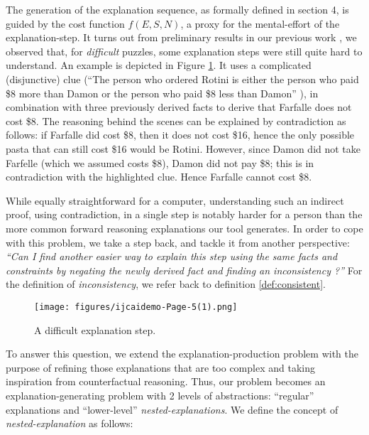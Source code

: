 The generation of the explanation sequence, as formally defined in section 4, is guided by the cost function $f(E, S, N)$, a proxy for the mental-effort of the explanation-step. 
It turns out from preliminary results in our previous work \cite{ecai/BogaertsGCG20}, we observed that, for \textit{difficult} puzzles, some explanation steps were still quite hard to understand. An example is depicted in Figure \ref{fig:pasta_diff}.
It uses a complicated (disjunctive) clue (``The person who ordered Rotini is either the person who paid \$8 more than Damon or the person who paid \$8 less than Damon'' ), in combination with three previously derived facts to derive that Farfalle does not cost \$8. 
The reasoning behind the scenes can be explained by contradiction as follows: if Farfalle did cost \$8, then it does not cost \$16, hence the only possible pasta that can still cost \$16 would be Rotini.  However, since Damon did not take Farfelle (which we assumed costs \$8), Damon did not pay \$8; this is in contradiction with the highlighted clue. Hence Farfalle cannot cost \$8. 

While equally straightforward for a computer, understanding such an indirect proof, using contradiction, in a single step is notably harder for a person than the more common forward reasoning explanations our tool generates. 
In order to cope with this problem, we take a step back, and tackle it from another perspective: \textit{``Can I find another easier way to explain this step using the same facts and constraints by negating the newly derived fact and finding an inconsistency ?''} For the definition of \textit{inconsistency}, we refer back to definition \ref{def:consistent}.


\begin{figure}[H]
    \texttt{[image: figures/ijcaidemo-Page-5(1).png]}
    \caption{A difficult explanation step.}\label{fig:pasta_diff}
    \end{figure}

To answer this question, we extend the explanation-production problem with the purpose of refining those explanations that are too complex and taking inspiration from counterfactual reasoning. 
Thus, our problem becomes an explanation-generating problem with 2 levels of abstractions: ``regular'' explanations and ``lower-level'' \textit{nested-explanations}. 
We define the concept of \emph{nested-explanation} as follows:

